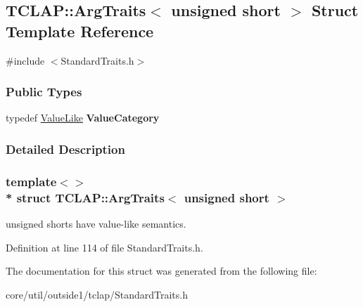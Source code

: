 \hypertarget{structTCLAP_1_1ArgTraits_3_01unsigned_01short_01_4}{}\subsection{T\+C\+L\+AP\+:\+:Arg\+Traits$<$ unsigned short $>$ Struct Template Reference}
\label{structTCLAP_1_1ArgTraits_3_01unsigned_01short_01_4}


{\ttfamily \#include $<$Standard\+Traits.\+h$>$}

\subsubsection*{Public Types}
\begin{DoxyCompactItemize}
\item 
typedef \hyperlink{structTCLAP_1_1ValueLike}{Value\+Like} {\bfseries Value\+Category}\hypertarget{structTCLAP_1_1ArgTraits_3_01unsigned_01short_01_4_a0efa2ce53e9cb98dc4a58dda24127d3a}{}\label{structTCLAP_1_1ArgTraits_3_01unsigned_01short_01_4_a0efa2ce53e9cb98dc4a58dda24127d3a}

\end{DoxyCompactItemize}


\subsubsection{Detailed Description}
\subsubsection*{template$<$$>$\\*
struct T\+C\+L\+A\+P\+::\+Arg\+Traits$<$ unsigned short $>$}

unsigned shorts have value-\/like semantics. 

Definition at line 114 of file Standard\+Traits.\+h.



The documentation for this struct was generated from the following file\+:\begin{DoxyCompactItemize}
\item 
core/util/outside1/tclap/Standard\+Traits.\+h\end{DoxyCompactItemize}

